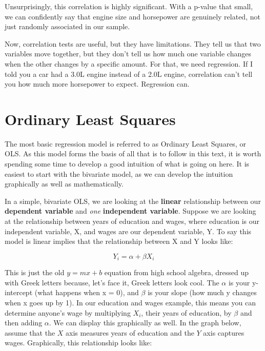 \documentclass[
  letterpaper,
]{book}
\begin{document}
Unsurprisingly, this correlation is highly significant. With a p-value
that small, we can confidently say that engine size and horsepower are
genuinely related, not just randomly associated in our sample.

Now, correlation tests are useful, but they have limitations. They tell
us that two variables move together, but they don't tell us how much one
variable changes when the other changes by a specific amount. For that,
we need regression. If I told you a car had a 3.0L engine instead of a
2.0L engine, correlation can't tell you how much more horsepower to
expect. Regression can.

\section{Ordinary Least Squares}\label{ordinary-least-squares}

The most basic regression model is referred to as Ordinary Least
Squares, or OLS. As this model forms the basis of all that is to follow
in this text, it is worth spending some time to develop a good intuition
of what is going on here. It is easiest to start with the bivariate
model, as we can develop the intuition graphically as well as
mathematically.

In a simple, bivariate OLS, we are looking at the \textbf{linear}
relationship between our \textbf{dependent variable} and \emph{one}
\textbf{independent variable}. Suppose we are looking at the
relationship between years of education and wages, where education is
our independent variable, X, and wages are our dependent variable, Y. To
say this model is linear implies that the relationship between X and Y
looks like:

\begin{equation}
Y_{i} = \alpha + \beta X_{i} 
\end{equation}

This is just the old \(y = mx + b\) equation from high school algebra,
dressed up with Greek letters because, let's face it, Greek letters look
cool. The \(\alpha\) is your y-intercept (what happens when x = 0), and
\(\beta\) is your slope (how much y changes when x goes up by 1). In our
education and wages example, this means you can determine anyone's wage
by multiplying \(X_i\), their years of education, by \(\beta\) and then
adding \(\alpha\). We can display this graphically as well. In the graph
below, assume that the \(X\) axis measures years of education and the
\(Y\) axis captures wages. Graphically, this relationship looks like:
\end{document}
